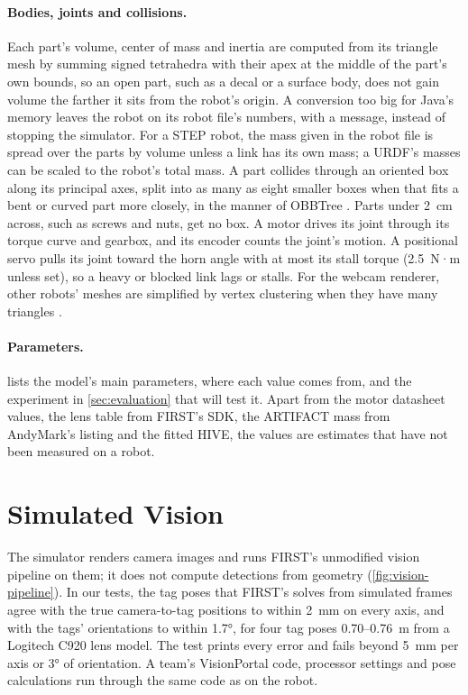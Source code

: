 \documentclass[10pt,twocolumn,letterpaper]{article}
\begin{document}
\paragraph{Bodies, joints and collisions.} Each part's volume, center of mass and inertia are computed from its triangle mesh by summing signed tetrahedra with their apex at the middle of the part's own bounds, so an open part, such as a decal or a surface body, does not gain volume the farther it sits from the robot's origin. A conversion too big for Java's memory leaves the robot on its robot file's numbers, with a message, instead of stopping the simulator. For a STEP robot, the mass given in the robot file is spread over the parts by volume unless a link has its own mass; a URDF's masses can be scaled to the robot's total mass. A part collides through an oriented box along its principal axes, split into as many as eight smaller boxes when that fits a bent or curved part more closely, in the manner of OBBTree \citep{gottschalk1996obbtree}. Parts under 2~cm across, such as screws and nuts, get no box. A motor drives its joint through its torque curve and gearbox, and its encoder counts the joint's motion. A positional servo pulls its joint toward the horn angle with at most its stall torque (2.5~N·m unless set), so a heavy or blocked link lags or stalls. For the webcam renderer, other robots' meshes are simplified by vertex clustering when they have many triangles \citep{rossignac1993multi}.

\paragraph{Parameters.}  lists the model’s main parameters, where each value comes from, and the experiment in \cref{sec:evaluation} that will test it. Apart from the motor datasheet values, the lens table from FIRST's SDK, the ARTIFACT mass from AndyMark's listing and the fitted HIVE, the values are estimates that have not been measured on a robot.

\section{Simulated Vision}\label{sec:vision}

The simulator renders camera images and runs FIRST's unmodified vision pipeline on them; it does not compute detections from geometry (\cref{fig:vision-pipeline}). In our tests, the tag poses that FIRST's  solves from simulated frames agree with the true camera-to-tag positions to within 2~mm on every axis, and with the tags' orientations to within 1.7°, for four tag poses 0.70–0.76~m from a Logitech C920 lens model. The test prints every error and fails beyond 5~mm per axis or 3° of orientation. A team's VisionPortal code, processor settings and pose calculations run through the same code as on the robot.
\end{document}
